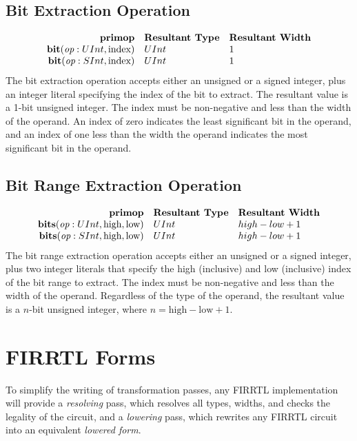 \documentclass[12pt]{article}
\begin{document}
\subsection{Bit Extraction Operation}
\[
\begin{array}{rll}
\text{\bf primop} & \text{\bf Resultant Type} & \text{\bf Resultant Width} \\
\text{\bf bit}(\text{\em op}:UInt, \text{index})  & UInt & 1    \\
\text{\bf bit}(\text{\em op}:SInt, \text{index})  & UInt & 1    \\
\end{array}
\]
The bit extraction operation accepts either an unsigned or a signed integer, plus an integer literal specifying the index of the bit to extract.
The resultant value is a 1-bit unsigned integer.
The index must be non-negative and less than the width of the operand.
An index of zero indicates the least significant bit in the operand, and an index of one less than the width the operand indicates the most significant bit in the operand.

\subsection{Bit Range Extraction Operation}
\[
\begin{array}{rll}
\text{\bf primop} & \text{\bf Resultant Type} & \text{\bf Resultant Width} \\
\text{\bf bits}(\text{\em op}:UInt, \text{high}, \text{low})  & UInt & high - low + 1    \\
\text{\bf bits}(\text{\em op}:SInt, \text{high}, \text{low})  & UInt & high - low + 1    \\
\end{array}
\]
The bit range extraction operation accepts either an unsigned or a signed integer, plus two integer literals that specify the high (inclusive) and low (inclusive) index of the bit range to extract.
The index must be non-negative and less than the width of the operand.
Regardless of the type of the operand, the resultant value is a $n$-bit unsigned integer, where $n = \text{high} - \text{low} + 1$. 

\section{FIRRTL Forms}

To simplify the writing of transformation passes, any FIRRTL implementation will provide a {\em resolving} pass, which resolves all types, widths, and checks the legality of the circuit, and a {\em lowering} pass, which rewrites any FIRRTL circuit into an equivalent {\em lowered form}.
\end{document}
